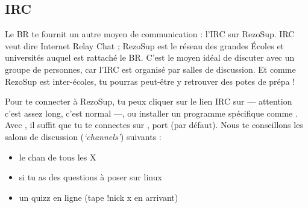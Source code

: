 
\subsection{IRC}

\label{irc}

Le BR te fournit un autre moyen de communication : l'IRC sur RezoSup. IRC veut dire Internet Relay Chat ; RezoSup est le r\'eseau des grandes \'Ecoles et universit\'es auquel est rattach\'e le BR. C'est le moyen id\'eal de discuter avec un groupe de personnes, car l'IRC est organis\'e par salles de discussion. Et comme RezoSup est inter-\'ecoles, tu pourras peut-\^etre y retrouver des potes de pr\'epa !

Pour te connecter \`a RezoSup, tu peux cliquer sur le lien IRC sur \fkz --- attention c'est assez long, c'est normal ---, ou installer un programme sp\'ecifique comme . Avec , il suffit que tu te connectes sur , port  (par d\'efaut). Nous te conseillons les salons de discussion (\textit{`channels'}) suivants :
\begin{itemize}
  \item {} le chan de tous les X
  \item {} si tu as des questions \`a poser sur linux
  \item {} un quizz en ligne (tape !nick x en arrivant)
\end{itemize}

